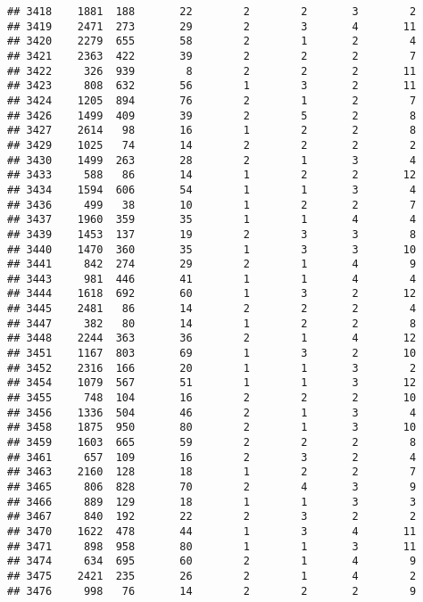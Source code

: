 \documentclass[]{article}
\begin{document}
\begin{verbatim}
## 3418    1881  188       22        2        2       3        2
## 3419    2471  273       29        2        3       4       11
## 3420    2279  655       58        2        1       2        4
## 3421    2363  422       39        2        2       2        7
## 3422     326  939        8        2        2       2       11
## 3423     808  632       56        1        3       2       11
## 3424    1205  894       76        2        1       2        7
## 3426    1499  409       39        2        5       2        8
## 3427    2614   98       16        1        2       2        8
## 3429    1025   74       14        2        2       2        2
## 3430    1499  263       28        2        1       3        4
## 3433     588   86       14        1        2       2       12
## 3434    1594  606       54        1        1       3        4
## 3436     499   38       10        1        2       2        7
## 3437    1960  359       35        1        1       4        4
## 3439    1453  137       19        2        3       3        8
## 3440    1470  360       35        1        3       3       10
## 3441     842  274       29        2        1       4        9
## 3443     981  446       41        1        1       4        4
## 3444    1618  692       60        1        3       2       12
## 3445    2481   86       14        2        2       2        4
## 3447     382   80       14        1        2       2        8
## 3448    2244  363       36        2        1       4       12
## 3451    1167  803       69        1        3       2       10
## 3452    2316  166       20        1        1       3        2
## 3454    1079  567       51        1        1       3       12
## 3455     748  104       16        2        2       2       10
## 3456    1336  504       46        2        1       3        4
## 3458    1875  950       80        2        1       3       10
## 3459    1603  665       59        2        2       2        8
## 3461     657  109       16        2        3       2        4
## 3463    2160  128       18        1        2       2        7
## 3465     806  828       70        2        4       3        9
## 3466     889  129       18        1        1       3        3
## 3467     840  192       22        2        3       2        2
## 3470    1622  478       44        1        3       4       11
## 3471     898  958       80        1        1       3       11
## 3474     634  695       60        2        1       4        9
## 3475    2421  235       26        2        1       4        2
## 3476     998   76       14        2        2       2        9

\end{verbatim}
\end{document}
